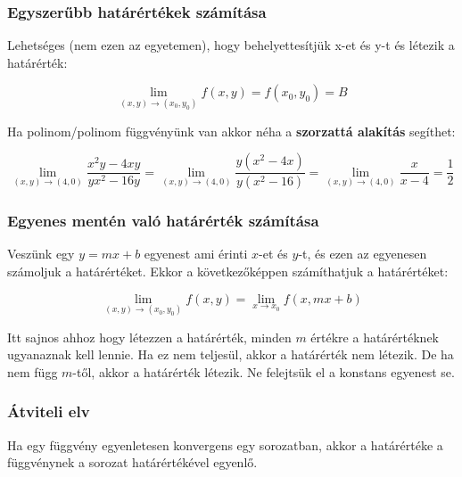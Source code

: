 \documentclass{article}
\begin{document}
\subsubsection{Egyszerűbb határértékek számítása}

Lehetséges (nem ezen az egyetemen), hogy behelyettesítjük x-et és y-t és létezik a határérték:

\begin{equation*}
    \lim_{(x,y) \to (x_0, y_0)} f(x,y) = f(x_0, y_0)  =B
\end{equation*}

\vspace{4mm}

Ha polinom/polinom függvényünk van ak\-kor né\-ha a \textbf{szor\-zattá a\-lak\-ít\-ás} se\-gít\-het:

\begin{equation*}
    \lim_{(x,y) \to (4, 0)} \frac{x^2 y -4xy}{yx^2 -16y} = \lim_{(x,y) \to (4, 0)} \frac{y(x^2-4x)}{y(x^2 -16)} = \lim_{(x,y) \to (4, 0)} \frac{x}{x-4} = \frac{1}{2}
\end{equation*}

\subsubsection{Egyenes mentén való határérték számítása}

Veszünk egy $y = mx + b$ egyenest ami érinti $x$-et és $y$-t, és ezen az egyenesen szá\-mol\-juk a határ\-ér\-téket. Ek\-kor a kö\-vet\-ke\-ző\-kép\-pen számíthatjuk a határértéket:

\begin{equation*}
    \lim_{(x,y) \to (x_0, y_0)} f(x,y) = \lim_{x \to x_0} f(x, mx + b)
\end{equation*}

Itt sajnos ahhoz hogy létezzen a határérték, minden $m$ értékre a ha\-tár\-ér\-ték\-nek ugyanaznak kell lennie. Ha ez nem teljesül, akkor a határérték nem létezik. 
De ha nem függ $m$-től, akkor a határérték létezik. Ne felejtsük el a konstans egyenest se.


\subsubsection{Átviteli elv}

Ha egy függvény egyenletesen konvergens egy sorozatban, akkor a határértéke a függvénynek a sorozat határértékével egyenlő.
\end{document}
